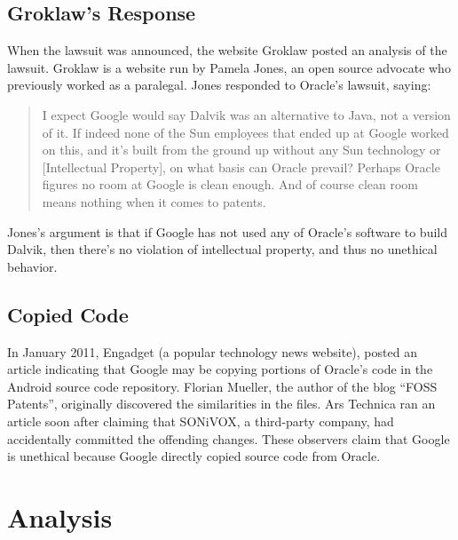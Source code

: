 \documentclass[11pt]{article}
\begin{document}
\begin{multicols}{2}

\subsection{Groklaw's Response} %
\label{sub:args_groklaw}

When the lawsuit was announced, the website Groklaw posted an analysis of the
lawsuit.  Groklaw is a website run by Pamela Jones, an open source advocate who
previously worked as a paralegal. \cite{groklaw-pj} Jones responded to Oracle's
lawsuit, saying: \cite{groklaw}

\begin{quotation}
I expect Google would say Dalvik was an alternative to Java, not a version of
it. If indeed none of the Sun employees that ended up at Google worked on this,
and it's built from the ground up without any Sun technology or [Intellectual
Property], on what basis can Oracle prevail? Perhaps Oracle figures no room at
Google is clean enough. And of course clean room means nothing when it comes to
patents.
\end{quotation}

Jones's argument is that if Google has not used any of Oracle's software to
build Dalvik, then there's no violation of intellectual property, and thus no
unethical behavior.


\subsection{Copied Code} %
\label{sub:fosspatents}

In January 2011, Engadget (a popular technology news website), posted an article
indicating that Google may be copying portions of Oracle's code in the Android
source code repository.  \cite{android-copies-java-code}  Florian Mueller, the
author of the blog ``FOSS Patents'', originally discovered the similarities in
the files.  \cite{fosspatents}  Ars Technica ran an article soon after claiming
that SONiVOX, a third-party company, had accidentally committed the offending
changes. \cite{ars-tech-copying} These observers claim that Google is unethical
because Google directly copied source code from Oracle.



\section{Analysis} %
\label{sec:analysis}


\end{multicols}
\end{document}
